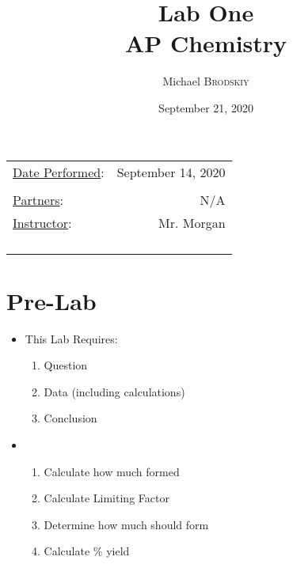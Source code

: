 \documentclass{article}
\title{Lab One \\ AP Chemistry}
\author{Michael \textsc{Brodskiy}}
\date{September 21, 2020}
\begin{document}
\maketitle
\begin{center}
\begin{tabular}{l r}
\underline{Date Performed}: & September 14, 2020 \\\\ %
\underline{Partners}: & N/A \\
\underline{Instructor}: & Mr. Morgan \\\\\\\\\\ %
\end{tabular}
\end{center}
\newpage

\tableofcontents

\newpage

\section{Pre-Lab}

\begin{itemize}

  \item This Lab Requires:

    \begin{enumerate}

      \item Question

      \item Data (including calculations)
        
      \item Conclusion

    \end{enumerate}

  \item {}

    \begin{enumerate}

      \item Calculate how much  formed

      \item Calculate Limiting Factor

      \item Determine how much  should form

      \item Calculate \% yield

    \end{enumerate}

\end{itemize}
\end{document}
